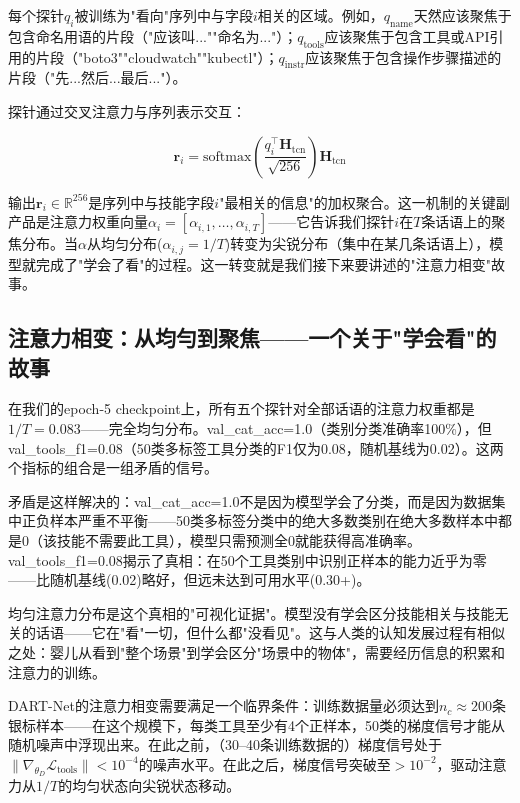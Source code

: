 \documentclass[twocolumn,10.5pt]{ctexart}
\def\cL{\mathcal{L}}
\begin{document}
每个探针$q_i$被训练为"看向"序列中与字段$i$相关的区域。例如，$q_{\text{name}}$天然应该聚焦于包含命名用语的片段（"应该叫...""命名为..."）；$q_{\text{tools}}$应该聚焦于包含工具或API引用的片段（"boto3""cloudwatch""kubectl"）；$q_{\text{instr}}$应该聚焦于包含操作步骤描述的片段（"先...然后...最后..."）。

探针通过交叉注意力与序列表示交互：

\begin{equation}
\mathbf{r}_i = \text{softmax}\left(\frac{q_i^\top \mathbf{H}_{\text{tcn}}}{\sqrt{256}}\right) \mathbf{H}_{\text{tcn}}
\label{eq:cross_attn}
\end{equation}

输出$\mathbf{r}_i \in \mathbb{R}^{256}$是序列中与技能字段$i$"最相关的信息"的加权聚合。这一机制的关键副产品是注意力权重向量$\alpha_i = [\alpha_{i,1}, \ldots, \alpha_{i,T}]$——它告诉我们探针$i$在$T$条话语上的聚焦分布。当$\alpha$从均匀分布($\alpha_{i,j} = 1/T$)转变为尖锐分布（集中在某几条话语上），模型就完成了"学会了看"的过程。这一转变就是我们接下来要讲述的"注意力相变"故事。

\subsection{注意力相变：从均勻到聚焦——一个关于"学会看"的故事}

在我们的epoch-5 checkpoint上，所有五个探针对全部话语的注意力权重都是$1/T = 0.083$——完全均匀分布。val\_cat\_acc=1.0（类别分类准确率100\%），但val\_tools\_f1=0.08（50类多标签工具分类的F1仅为0.08，随机基线为0.02）。这两个指标的组合是一组矛盾的信号。

矛盾是这样解决的：val\_cat\_acc=1.0不是因为模型学会了分类，而是因为数据集中正负样本严重不平衡——50类多标签分类中的绝大多数类别在绝大多数样本中都是0（该技能不需要此工具），模型只需预测全0就能获得高准确率。val\_tools\_f1=0.08揭示了真相：在50个工具类别中识别正样本的能力近乎为零——比随机基线(0.02)略好，但远未达到可用水平(0.30+)。

均匀注意力分布是这个真相的"可视化证据"。模型没有学会区分技能相关与技能无关的话语——它在"看"一切，但什么都"没看见"。这与人类的认知发展过程有相似之处：婴儿从看到"整个场景"到学会区分"场景中的物体"，需要经历信息的积累和注意力的训练。

DART-Net的注意力相变需要满足一个临界条件：训练数据量必须达到$n_c \approx 200$条银标样本——在这个规模下，每类工具至少有4个正样本，50类的梯度信号才能从随机噪声中浮现出来。在此之前，（30--40条训练数据的）梯度信号处于$\|\nabla_{\theta_D} \cL_{\text{tools}}\| < 10^{-4}$的噪声水平。在此之后，梯度信号突破至$>10^{-2}$，驱动注意力从$1/T$的均匀状态向尖锐状态移动。
\end{document}
